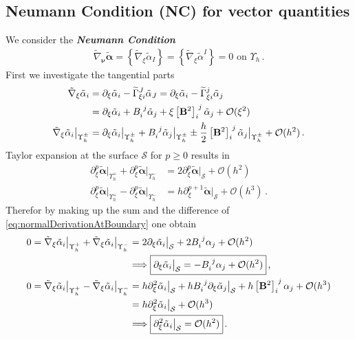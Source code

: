 \documentclass[a4paper,10pt]{scrartcl}
\newcommand{\surf}{\mathcal{S}}
\newcommand{\landau}{\mathcal{O}}
\newcommand{\nub}{\bm{\nu}}
\newcommand{\Bb}{\mathbf{B}}
\newcommand{\alphab}{\bm{\alpha}}
\newcommand{\talphab}{\tilde{\alphab}}
\newcommand{\talpha}{\tilde{\alpha}}
\newcommand{\tnabla}{\tilde{\nabla}}
\newcommand{\tch}[2]{\widetilde{\Gamma}_{#1}^{#2}}
\newcommand{\boundary}[1]{\Upsilon_{h}^{#1}}
\newcommand{\AtBoundary}[1]{\big|_{\boundary{#1}}}
\newcommand{\AtSurface}{\big|_{\surf}}
\newcommand{\formComma}{\,\text{,}}
\newcommand{\formPeriod}{\,\text{.}}
\newcommand{\newterm}[1]{\textbf{\textit{#1}}}
\begin{document}
  \subsection{Neumann Condition (NC) for vector quantities}
    We consider the \newterm{Neumann Condition}
    \begin{align}
      \tnabla_{\nub}\talphab = \left\{ \tnabla_{\xi}\talpha_{I} \right\} = \left\{ \tnabla_{\xi}\talpha^{I} \right\} = 0 \text{ on }\boundary{} \formPeriod
      \tag{NPC}
    \end{align}
    First we investigate the tangential parts 
    \begin{align}
      \tnabla_{\xi}\talpha_{i} 
              &= \partial_{\xi}\talpha_{i} - \tch{\xi i}{J}\talpha_{J} 
              = \partial_{\xi}\talpha_{i} - \tch{\xi i}{j}\talpha_{j}\\
              &= \partial_{\xi}\talpha_{i} + \tensor{B}{_{i}^{j}}\talpha_{j} + \xi\tensor{\left[ \Bb^{2} \right]}{_{i}^{j}}\talpha_{j} + \landau(\xi^{2})\\
      \tnabla_{\xi}\talpha_{i}\AtBoundary{\pm}
              &= \partial_{\xi}\talpha_{i}\AtBoundary{\pm} + \tensor{B}{_{i}^{j}}\talpha_{j}\AtBoundary{\pm} 
                      \pm \frac{h}{2} \tensor{\left[ \Bb^{2} \right]}{_{i}^{j}}\talpha_{j}\AtBoundary{\pm} + \landau(h^{2}) \formPeriod \label{eq:normalDerivationAtBoundary}
    \end{align}
    Taylor expansion at the surface \( \surf \) for \( p \ge 0 \) results in
    \begin{align}
      \partial_{\xi}^{p}\talphab\AtBoundary{+} + \partial_{\xi}^{p}\talphab\AtBoundary{-}
          &= 2\partial_{\xi}^{p}\talphab\AtSurface + \landau(h^{2}) \\
      \partial_{\xi}^{p}\talphab\AtBoundary{+} - \partial_{\xi}^{p}\talphab\AtBoundary{-}
          &= h \partial_{\xi}^{p+1}\talphab\AtSurface + \landau(h^{3}) \formPeriod
    \end{align}
    Therefor by making up the sum and the difference of \eqref{eq:normalDerivationAtBoundary} one obtain 
    \begin{align}
      0 = \tnabla_{\xi}\talpha_{i}\AtBoundary{+} + \tnabla_{\xi}\talpha_{i}\AtBoundary{-}
          &= 2\partial_{\xi}\talpha_{i}\AtSurface + 2\tensor{B}{_{i}^{j}}\alpha_{j} + \landau(h^{2})\\
          &\Longrightarrow \boxed{\partial_{\xi}\talpha_{i}\AtSurface = - \tensor{B}{_{i}^{j}}\alpha_{j} + \landau(h^{2})} \formComma \label{eq:NeumannFirstOrderFlat}\\
      0 = \tnabla_{\xi}\talpha_{i}\AtBoundary{+} - \tnabla_{\xi}\talpha_{i}\AtBoundary{-}
          &= h\partial_{\xi}^{2}\talpha_{i}\AtSurface + h\tensor{B}{_{i}^{j}}\partial_{\xi}\talpha_{j}\AtSurface + h\tensor{\left[ \Bb^{2} \right]}{_{i}^{j}}\alpha_{j} + \landau(h^{3})\\
          &= h\partial_{\xi}^{2}\talpha_{i}\AtSurface + \landau(h^{3})\\
        &\Longrightarrow \boxed{\partial_{\xi}^{2}\talpha_{i}\AtSurface = \landau(h^{2})} \formPeriod \label{eq:NeumannSecondOrderFlat}
    \end{align}
\end{document}
